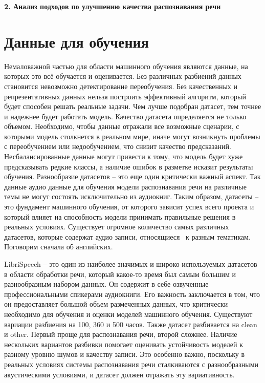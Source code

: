 \newpage
\begin{center}
  \textbf{\large 2. Анализ подходов по улучшению качества распознавания речи}
\end{center}

\section{Данные для обучения}

Немаловажной частью для области машинного обучения являются данные, на которых это всё обучается и оценивается.
Без различных разбиений данных становится невозможно детектирование переобучения.
Без качественных и репрезентативных данных нельзя построить эффективный алгоритм, который будет способен решать реальные задачи.
Чем лучше подобран датасет, тем точнее и надежнее будет работать модель.
Качество датасета определяется не только объемом.
Необходимо, чтобы данные отражали все возможные сценарии, с которыми модель столкнется в реальном мире, иначе могут возникнуть проблемы с переобучением или недообучением, что снизит качество предсказаний.
Несбалансированные данные могут привести к тому, что модель будет хуже предсказывать редкие классы, а наличие ошибок в разметке исказит результаты обучения.
Разнообразие датасетов -- это еще один критически важный аспект.
Так данные аудио данные для обучения модели распознавания речи на различные темы не могут состоять исключительно из аудиокниг.
Таким образом, датасеты -- это фундамент машинного обучения, от которого зависит успех всего проекта и который влияет на способность модели принимать правильные решения в реальных условиях.
Существует огромное количество самых различных датасетов, которые содержат аудио записи, относящиеся  к разным тематикам.
Поговорим сначала об английских.

LibriSpeech\cite{panayotov2015librispeech} -- это один из наиболее значимых и широко используемых датасетов в области обработки речи, который какое-то время был самым большим и разнообразным набором данных.
Он содержит в себе озвученные профессиональными спикерами аудиокниги.
Его важность заключается в том, что он предоставляет большой объем размеченных данных, что критически необходимо для обучения и оценки моделей машинного обучения.
Существуют вариации разбиения на 100, 360 и 500 часов.
Также датасет разбивается на clean и other.
Первый проще для распознавания речи, второй сложнее.
Наличие нескольких вариантов разбивки помогает оценивать устойчивость моделей к разному уровню шумов и качеству записи.
Это особенно важно, поскольку в реальных условиях системы распознавания речи сталкиваются с разнообразными акустическими условиями, и датасет должен отражать эту вариативность.

